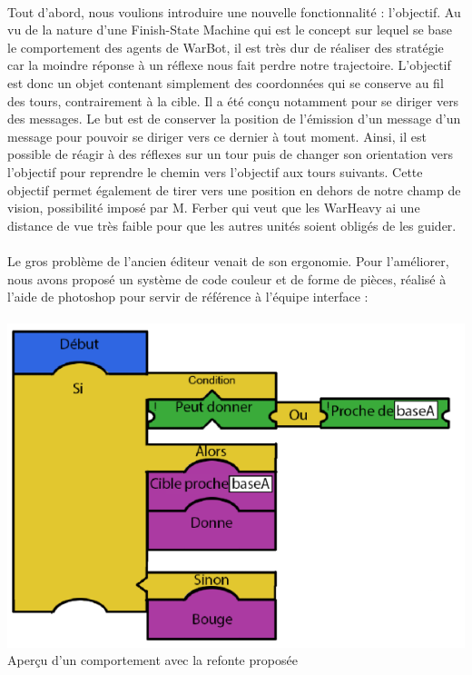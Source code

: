 \documentclass{report}
\begin{document}
\paragraph{}
  Tout d’abord, nous voulions introduire une nouvelle fonctionnalité : l’objectif. Au vu de la nature d’une Finish-State Machine qui est le concept sur lequel se base le comportement des agents de WarBot, il est très dur de réaliser des stratégie car la moindre réponse à un réflexe nous fait perdre notre trajectoire. \newline
L’objectif est donc un objet contenant simplement des coordonnées qui se conserve au fil des tours, contrairement à la cible. Il a été conçu notamment pour se diriger vers des messages. Le but est de conserver la position de l’émission d’un message d’un message pour pouvoir se diriger vers ce dernier à tout moment. \newline
Ainsi, il est possible de réagir à des réflexes sur un tour puis de changer son orientation vers l’objectif pour reprendre le chemin vers l’objectif aux tours suivants. Cette objectif permet également de tirer vers une position en dehors de notre champ de vision, possibilité imposé par M. Ferber qui veut que les WarHeavy ai une distance de vue très faible pour que les autres unités soient obligés de les guider.
\newpage
\paragraph{}
  Le gros problème de l’ancien éditeur venait de son ergonomie. Pour l’améliorer, nous avons proposé un système de code couleur et de forme de pièces, réalisé à l’aide de photoshop pour servir de référence à l’équipe interface :

\paragraph{}
\begin{center}
\includegraphics[scale=0.7]{DATA/propLangage.png}
 {Aperçu d'un comportement avec la refonte proposée}
\end{center}
\end{document}

